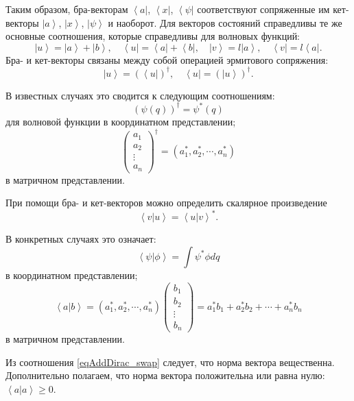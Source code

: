 Таким образом, бра-векторам
$\left< a \right|$,  $\left< x \right|$, $\left< \psi \right|$
соответствуют сопряженные им кет-векторы  
$\left| a \right>$,  $\left| x \right>$, $\left| \psi \right>$
и наоборот. Для векторов состояний справедливы те же основные
соотношения, которые справедливы для волновых функций:  
\begin{equation}
\left| u \right> = \left| a \right>  + \left| b \right>, \quad 
\left< u \right| = \left< a \right|  + \left< b \right|, \quad 
\left| v \right> = l \left| a \right>, \quad  
\left< v \right| = l \left< a \right|.
\end{equation}
Бра- и кет-векторы связаны между собой операцией эрмитового 
сопряжения:
\begin{equation}
\left| u \right> = \left( \left< u \right| \right)^{\dag}, \quad 
\left< u \right| = \left( \left| u \right> \right)^{\dag}.
\end{equation}

В известных случаях это сводится к следующим соотношениям:
\[
\left( \psi\left( q \right) \right)^{\dag} = \psi^{*}\left( q \right)
\]
для волновой функции в координатном представлении;
\[
\left(
\begin{array} {c} 
a_1 \\
a_2 \\
\vdots \\
a_n
\end{array}
 \right)^{\dag} = 
\left( a_1^{*}, a_2^{*}, \cdots, a_n^{*}\right)
\]
в матричном представлении.

При помощи бра- и кет-векторов можно определить скалярное 
произведение
\begin{equation}
\left< v \right|\left. u \right> = \left< u \right|\left. v \right>^{*}.
\label{eqAddDirac_swap}
\end{equation}

В конкретных случаях это означает:
\[
\left< \psi \right|\left. \phi \right> = 
\int \psi^{*} \phi dq
\]
в координатном представлении;
\[
\left< a \right|\left. b \right> = 
\left( a_1^{*}, a_2^{*}, \cdots, a_n^{*}\right) 
\left(
\begin{array} {c} 
b_1 \\
b_2 \\
\vdots \\
b_n
\end{array}
 \right) = 
a_1^{*} b_1 +  a_2^{*} b_2 + \cdots + a_n^{*} b_n
\]
в матричном представлении.

Из соотношения \eqref{eqAddDirac_swap} следует, что норма вектора
вещественна. Дополнительно полагаем, что норма вектора положительна
или равна нулю: 
$\left< a \right|\left. a \right> \geq 0$.


